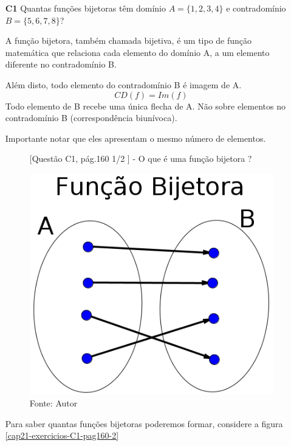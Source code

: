 \documentclass[a4paper,12pt]{article}
\begin{document}
\begin{enumerate}

\item[\textbf{C1}] Quantas funções bijetoras têm domínio $A = \{1, 2, 3, 4 \}$ e contradomínio $B = \{5, 6, 7, 8 \}$? 

A função bijetora, também chamada bijetiva, é um tipo de função matemática que relaciona cada elemento do domínio A, a um elemento diferente no contradomínio B.

Além disto, todo elemento do contradomínio B é imagem de A.
                             $$CD (f) = Im(f)$$
Todo elemento de B recebe uma única flecha de A. Não sobre elementos no contradomínio B (correspondência biunívoca).

Importante notar que eles apresentam o mesmo número de elementos.

   \begin{figure}[!htb]
      \centering
      \caption{[Questão C1, pág.160 1/2 ] - O que é uma função bijetora ?}
      \includegraphics[scale=0.3]{../../imagens/cap21-exercicios-C1-pag160-1.png}
      \caption*{Fonte: Autor}
      \label{cap21-exercicios-C1-pag160-1}
    \end{figure}
    
Para saber quantas funções bijetoras poderemos formar, considere a figura \ref{cap21-exercicios-C1-pag160-2}


\end{enumerate}
\end{document}
